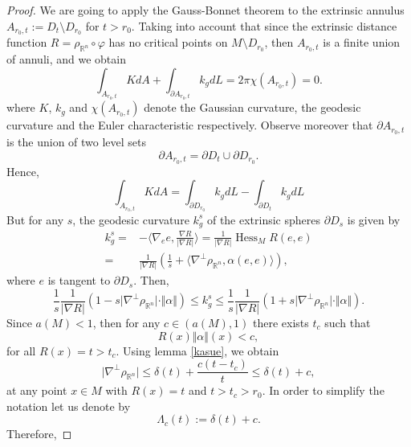 \documentclass[a4paper]{amsart}
\theoremstyle{definition}
\numberwithin{equation}{section}
\begin{document}
\begin{proof}
We are going to apply the Gauss-Bonnet theorem to the extrinsic annulus $A_{r_0,t}:=D_t\setminus D_{r_0}$ for $t>r_0$. Taking into account that since the extrinsic distance function $R=\rho_{{\mathbb{R}}^n}\circ \varphi$ has no critical points on $M\setminus D_{r_0}$, then ${A_{r_0,t}}$ is a finite union of annuli, and we obtain
\begin{equation}
\int_{A_{r_0,t}}K dA+\int_{\partial A_{r_0,t}}k_g dL=2\pi \chi({A_{r_0,t}})=0.
\end{equation} 
where $K$, $k_g$ and $\chi({A_{r_0,t}})$ denote the Gaussian curvature, the geodesic curvature and the Euler characteristic respectively.
Observe moreover that $\partial A_{r_0,t}$ is the union of two level sets
$$
\partial A_{r_0,t}=\partial D_t\cup \partial D_{r_0}.
$$
Hence,
\begin{equation}\label{Gauss-Bonn}
\int_{A_{r_0,t}}K dA=\int_{\partial D_{r_0}}k_g dL-\int_{\partial D_{t}}k_g dL
\end{equation} But for any $s$, the geodesic curvature $k_g^s$ of the extrinsic spheres $\partial D_s$ is given by
\begin{equation}
\begin{aligned}
k_g^s=&-\langle \nabla_e e,\frac{\nabla R}{\vert \nabla R\vert}\rangle=\frac{1}{\vert \nabla R\vert}{\operatorname{Hess}}_{M}R(e,e)\\
=&\frac{1}{\vert \nabla R\vert}\left(\frac{1}{s}+\langle \nabla^\perp {{\rho_{{\mathbb{R}}^n}}},\alpha(e,e)\rangle\right),
\end{aligned}
\end{equation}
where $e$ is tangent to $\partial D_s$. Then,
\begin{equation}
\frac{1}{s}\frac{1}{\vert \nabla R\vert}\left(1-s\vert \nabla^\perp {{\rho_{{\mathbb{R}}^n}}}\vert\cdot \Vert\alpha\Vert\right)\leq k_g^s\leq \frac{1}{s}\frac{1}{\vert \nabla R\vert}\left(1+s\vert \nabla^\perp {{\rho_{{\mathbb{R}}^n}}}\vert \cdot\Vert\alpha\Vert\right).
\end{equation}
Since $a(M)<1$, then for any $c\in (a(M),1)$ there exists $t_c$ such that
\begin{equation}
R(x)\Vert \alpha \Vert(x)<c,
\end{equation}
for all $R(x)=t>t_c$. Using lemma \ref{kasue}, we obtain
\begin{equation}\label{ine3.6} 
\vert \nabla^\perp {{\rho_{{\mathbb{R}}^n}}}\vert\leq \delta(t)+\frac{c(t-t_c)}{t}\leq \delta(t)+c,
\end{equation}
at any point $x\in M$ with $R(x)=t$ and $t>t_c>r_0$. In order to simplify the notation let us denote by 
\begin{equation}\label{deflam}
\Lambda_c(t):=\delta(t)+c.
\end{equation}
Therefore,


\end{proof}
\end{document}
